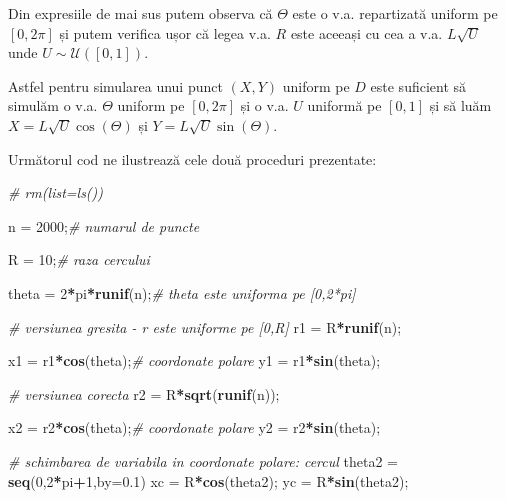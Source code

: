 \documentclass[]{article}
\newenvironment{Shaded}{\begin{snugshade}}{\end{snugshade}}
\newcommand{\CommentTok}[1]{\textcolor[rgb]{0.56,0.35,0.01}{\textit{#1}}}
\newcommand{\DataTypeTok}[1]{\textcolor[rgb]{0.13,0.29,0.53}{#1}}
\newcommand{\DecValTok}[1]{\textcolor[rgb]{0.00,0.00,0.81}{#1}}
\newcommand{\FloatTok}[1]{\textcolor[rgb]{0.00,0.00,0.81}{#1}}
\newcommand{\KeywordTok}[1]{\textcolor[rgb]{0.13,0.29,0.53}{\textbf{#1}}}
\newcommand{\NormalTok}[1]{#1}
\newcommand{\OperatorTok}[1]{\textcolor[rgb]{0.81,0.36,0.00}{\textbf{#1}}}
\newcommand{\StringTok}[1]{\textcolor[rgb]{0.31,0.60,0.02}{#1}}
\begin{document}
Din expresiile de mai sus putem observa că \(\Theta\) este o v.a.
repartizată uniform pe \([0,2\pi]\) și putem verifica ușor că legea v.a.
\(R\) este aceeași cu cea a v.a. \(L\sqrt{U}\) unde
\(U\sim\mathcal{U}([0,1])\).

Astfel pentru simularea unui punct \((X,Y)\) uniform pe \(D\) este
suficient să simulăm o v.a. \(\Theta\) uniform pe \([0,2\pi]\) și o v.a.
\(U\) uniformă pe \([0,1]\) și să luăm \(X=L\sqrt{U}\cos(\Theta)\) și
\(Y=L\sqrt{U}\sin(\Theta)\).

Următorul cod ne ilustrează cele două proceduri prezentate:

\begin{Shaded}
\begin{Highlighting}[]
\CommentTok{# rm(list=ls())}

\NormalTok{n =}\StringTok{ }\DecValTok{2000}\NormalTok{;}\CommentTok{# numarul de puncte}

\NormalTok{R =}\StringTok{ }\DecValTok{10}\NormalTok{;}\CommentTok{# raza cercului }

\NormalTok{theta =}\StringTok{ }\DecValTok{2}\OperatorTok{*}\NormalTok{pi}\OperatorTok{*}\KeywordTok{runif}\NormalTok{(n);}\CommentTok{# theta este uniforma pe [0,2*pi]}

\CommentTok{# versiunea gresita - r este uniforme pe [0,R]}
\NormalTok{r1 =}\StringTok{ }\NormalTok{R}\OperatorTok{*}\KeywordTok{runif}\NormalTok{(n);}

\NormalTok{x1 =}\StringTok{ }\NormalTok{r1}\OperatorTok{*}\KeywordTok{cos}\NormalTok{(theta);}\CommentTok{# coordonate polare}
\NormalTok{y1 =}\StringTok{ }\NormalTok{r1}\OperatorTok{*}\KeywordTok{sin}\NormalTok{(theta);}

\CommentTok{# versiunea corecta}
\NormalTok{r2 =}\StringTok{ }\NormalTok{R}\OperatorTok{*}\KeywordTok{sqrt}\NormalTok{(}\KeywordTok{runif}\NormalTok{(n));}

\NormalTok{x2 =}\StringTok{ }\NormalTok{r2}\OperatorTok{*}\KeywordTok{cos}\NormalTok{(theta);}\CommentTok{# coordonate polare}
\NormalTok{y2 =}\StringTok{ }\NormalTok{r2}\OperatorTok{*}\KeywordTok{sin}\NormalTok{(theta);}

\CommentTok{# schimbarea de variabila in coordonate polare: cercul}
\NormalTok{theta2 =}\StringTok{ }\KeywordTok{seq}\NormalTok{(}\DecValTok{0}\NormalTok{,}\DecValTok{2}\OperatorTok{*}\NormalTok{pi}\OperatorTok{+}\DecValTok{1}\NormalTok{,}\DataTypeTok{by=}\FloatTok{0.1}\NormalTok{) }
\NormalTok{xc =}\StringTok{ }\NormalTok{R}\OperatorTok{*}\KeywordTok{cos}\NormalTok{(theta2);}
\NormalTok{yc =}\StringTok{ }\NormalTok{R}\OperatorTok{*}\KeywordTok{sin}\NormalTok{(theta2);}


\end{Highlighting}
\end{Shaded}
\end{document}
